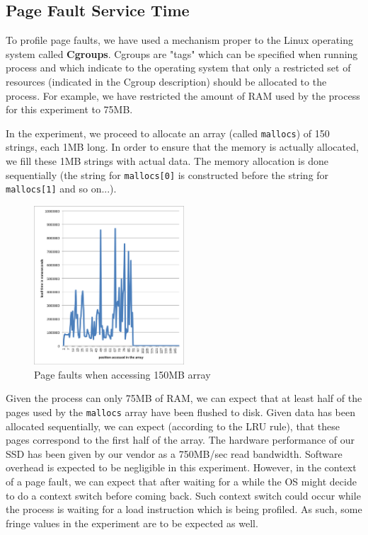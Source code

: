 \subsection{Page Fault Service Time}

To profile page faults, we have used a mechanism proper to the Linux operating system called \textbf{Cgroups}. Cgroups are "tags" which can be specified when running process and which indicate to the operating system that only a restricted set of resources (indicated in the Cgroup description) should be allocated to the process. For example, we have restricted the amount of RAM used by the process for this experiment to 75MB.

In the experiment, we proceed to allocate an array (called \texttt{mallocs}) of 150 strings, each 1MB long. In order to ensure that the memory is actually allocated, we fill these 1MB strings with actual data. The memory allocation is done sequentially (the string for \texttt{mallocs[0]} is constructed before the string for \texttt{mallocs[1]} and so on...).

\begin{figure}
 \centering
  \includegraphics[width=0.5\textwidth]{image/pagefault.png}
  \caption{Page faults when accessing 150MB array}
 \label{fig:pagefault}
\end{figure}

Given the process can only 75MB of RAM, we can expect that at least half of the pages used by the \texttt{mallocs} array have been flushed to disk. Given data has been allocated sequentially, we can expect (according to the LRU rule), that these pages correspond to the first half of the array. The hardware performance of our SSD has been given by our vendor as a 750MB/sec read bandwidth. Software overhead is expected to be negligible in this experiment. However, in the context of a page fault, we can expect that after waiting for a while the OS might decide to do a context switch before coming back. Such context switch could occur while the process is waiting for a load instruction which is being profiled. As such, some fringe values in the experiment are to be expected as well.

